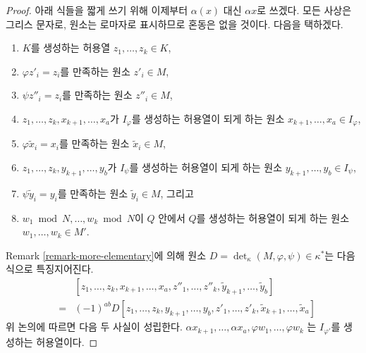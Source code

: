 \begin{proof}
\medskip\noindent
아래 식들을 짧게 쓰기 위해 이제부터 $\alpha(x)$ 대신 $\alpha x$로
쓰겠다. 모든 사상은 그리스 문자로, 원소는 로마자로 표시하므로 혼동은
없을 것이다.
다음을 택하겠다.
\begin{enumerate}
\item $K$를 생성하는 허용열 $z_1, \ldots, z_k \in K$,
\item $\varphi z'_i = z_i$를 만족하는 원소 $z'_i \in M$,
\item $\psi z''_i = z_i$를 만족하는 원소 $z''_i \in M$,
\item $z_1, \ldots, z_k, x_{k + 1}, \ldots, x_a$가 $I_\varphi$를
생성하는 허용열이 되게 하는 원소 $x_{k + 1}, \ldots, x_a \in I_\varphi$,
\item $\varphi \tilde x_i = x_i$를 만족하는 원소 $\tilde x_i \in M$,
\item $z_1, \ldots, z_k, y_{k + 1}, \ldots, y_b$가 $I_\psi$를 생성하는
허용열이 되게 하는 원소 $y_{k + 1}, \ldots, y_b \in I_\psi$,
\item $\psi \tilde y_i = y_i$를 만족하는 원소 $\tilde y_i \in M$,
그리고
\item $w_1 \bmod N, \ldots, w_k \bmod N$이 $Q$ 안에서 $Q$를 생성하는
허용열이 되게 하는 원소 $w_1, \ldots, w_k \in M'$.
\end{enumerate}
Remark \ref{remark-more-elementary}에 의해 원소
$D = \det_\kappa(M, \varphi, \psi) \in \kappa^*$는 다음 식으로
특징지어진다.
\begin{eqnarray*}
& &
[z_1, \ldots, z_k,
x_{k + 1}, \ldots, x_a,
z''_1, \ldots, z''_k,
\tilde y_{k + 1}, \ldots, \tilde y_b] \\
& = &
(-1)^{ab} D
[z_1, \ldots, z_k,
y_{k + 1}, \ldots, y_b,
z'_1, \ldots, z'_k,
\tilde x_{k + 1}, \ldots, \tilde x_a]
\end{eqnarray*}
위 논의에 따르면 다음 두 사실이 성립한다.
$\alpha x_{k + 1}, \ldots, \alpha x_a, \varphi w_1, \ldots, \varphi w_k$
는 $I_{\varphi'}$를 생성하는 허용열이다.


\end{proof}
